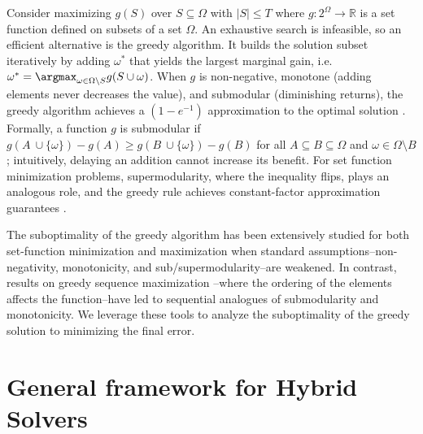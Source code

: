 \documentclass{article}
\newcommand{\ambuj}[1]{\textcolor{red}{AT: #1}}
\begin{document}
Consider maximizing $g(S)$ over $S\subseteq \Omega$ with $|S| \leq T$ where $g: 2^{\Omega} \to \mathbb{R}$ is a set function defined on subsets of a set $\Omega$. An exhaustive search is infeasible, so an efficient alternative is the greedy algorithm. It builds the solution subset iteratively by adding $\omega^*$ that yields the largest marginal gain, i.e. $\omega^* =  \argmax_{\omega \in \Omega \setminus S} g(S \cup \omega)$. When $g$ is non-negative, monotone (adding elements never decreases the value), and submodular (diminishing returns), the greedy algorithm achieves a $(1 - e^{-1})$ approximation to the optimal solution \citep{nemhauser1978analysis}. Formally, a function $g$ is submodular if $g(A \ \cup \{\omega\}) - g(A) \geq g(B \ \cup \{\omega\}) - g(B)$ for all $A \subseteq B \subseteq \Omega$ and $\omega \in \Omega \setminus B$; intuitively, delaying an addition cannot increase its benefit. For set function minimization problems, supermodularity, where the inequality flips, plays an analogous role, and the greedy rule achieves constant-factor approximation guarantees \citep{liberty2017greedy}.

The suboptimality of the greedy algorithm has been extensively studied for both set-function minimization \citep{bounia2023approximating}  and maximization \citep{das2018approximate,feige2011maximizing,bian2017guarantees,harshaw2019submodular} when standard assumptions--non-negativity, monotonicity, and sub/supermodularity--are weakened. In contrast, results on greedy sequence maximization \citep{streeter2008online,alaei2021maximizing,zhang2015string,bernardini2020through,van2024performance,tschiatschek2017selecting}--where the ordering of the elements affects the function--have led to sequential analogues of submodularity and monotonicity. We leverage these tools to analyze the suboptimality of the greedy solution to minimizing the final error.


\section{General framework for Hybrid Solvers}
\end{document}
